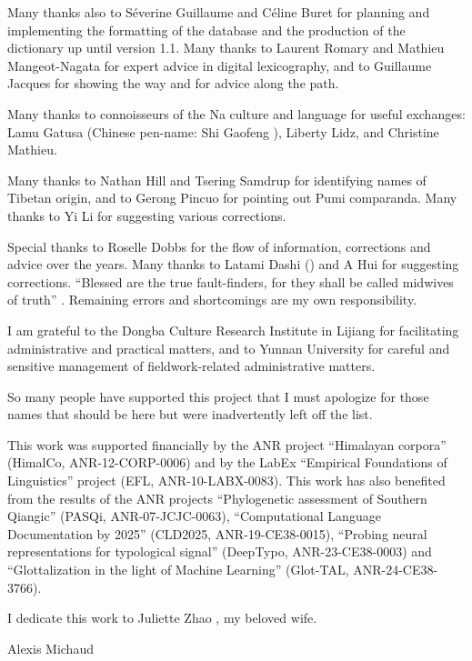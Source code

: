 Many thanks also to Séverine Guillaume and Céline Buret for planning and implementing the formatting of the database and the production of the dictionary up until version 1.1. Many thanks to Laurent Romary and Mathieu Mangeot-Nagata for expert advice in digital lexicography, and to Guillaume Jacques for showing the way and for advice along the path.

Many thanks to connoisseurs of the Na culture and language for useful exchanges: Lamu Gatusa  (Chinese pen-name: Shi Gaofeng ), Liberty Lidz, and Christine Mathieu.

Many thanks to Nathan Hill and Tsering Samdrup for identifying names of Tibetan origin, and to Gerong Pincuo  for pointing out Pumi comparanda. Many thanks to Yi Li  for suggesting various corrections.

Special thanks to Roselle Dobbs for the flow of information, corrections and advice over the years. Many thanks to Latami Dashi  () and A Hui  for suggesting corrections. ``Blessed are the true fault-finders, for they shall be called midwives of truth'' \parencite[vi]{yliniemi_descriptive_2022}. Remaining errors and shortcomings are my own responsibility.

I am grateful to the Dongba Culture Research Institute  in Lijiang for facilitating administrative and practical matters, and to Yunnan University for careful and sensitive management of fieldwork-related administrative matters.

So many people have supported this project that I must apologize for those names that should be here but were inadvertently left off the list.

This work was supported financially by the ANR project  “Himalayan corpora” (HimalCo, ANR-12-CORP-0006) and by the LabEx “Empirical Foundations of Linguistics” project (EFL, ANR-10-LABX-0083). This work has also benefited from the results of the ANR projects “Phylogenetic assessment of Southern Qiangic” (PASQi, ANR-07-JCJC-0063), “Computational Language Documentation by 2025” (CLD2025, ANR-19-CE38-0015), “Probing neural representations for typological signal” (DeepTypo, ANR-23-CE38-0003) and “Glottalization in the light of Machine Learning” (Glot-TAL, ANR-24-CE38-3766).

I dedicate this work to Juliette Zhao , my beloved wife.

{\raggedleft Alexis Michaud\par}

